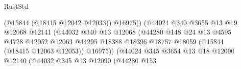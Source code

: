 \begin{lexlean}{RustStd}
\begin{coremodule}
                                                        (@15844 (@18415 @12042 @12033))
                                                        @16975))
                                                    (@44024
                                                      @340
                                                      @3655
                                                      @13
                                                      @19
                                                      @12068
                                                      @12141
                                                      (@44032
                                                        @340
                                                        @13
                                                        @12068
                                                        (@44280
                                                          @148
                                                          @24
                                                          @13
                                                          @4595
                                                          @4728
                                                          @12052
                                                          @12063
                                                          @44295
                                                          @18388
                                                          @18396
                                                          @18757
                                                          @18059
                                                          (@15844 (@18415 @12063 @12053))
                                                          @16975))
                                                      (@44024
                                                        @345
                                                        @3654
                                                        @13
                                                        @18
                                                        @12090
                                                        @12140
                                                        (@44032
                                                          @345
                                                          @13
                                                          @12090
                                                          (@44280
                                                            @153

\end{coremodule}
\end{lexlean}
